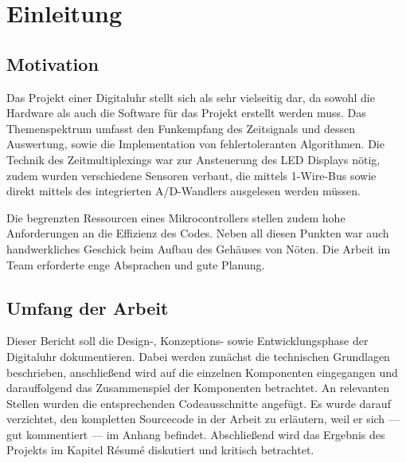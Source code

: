 \section{Einleitung}
\subsection{Motivation}
Das Projekt einer Digitaluhr stellt sich als sehr vielseitig dar, da sowohl die
Hardware als auch die Software für das Projekt erstellt werden muss. Das
Themenspektrum umfasst den Funkempfang des Zeitsignals und dessen Auswertung,
sowie die Implementation von fehlertoleranten Algorithmen. Die Technik des
Zeitmultiplexings war zur Ansteuerung des LED Displays nötig, zudem
wurden verschiedene Sensoren verbaut, die mittels 1-Wire-Bus sowie direkt mittels
des integrierten A/D-Wandlers ausgelesen werden müssen.

Die begrenzten Ressourcen eines Mikrocontrollers stellen zudem hohe
Anforderungen an die Effizienz des Codes. Neben all diesen Punkten war auch
handwerkliches Geschick beim Aufbau des Gehäuses von Nöten. Die Arbeit im Team
erforderte enge Absprachen und gute Planung.

\subsection{Umfang der Arbeit}
Dieser Bericht soll die Design-, Konzeptions- sowie Entwicklungsphase der Digitaluhr dokumentieren. Dabei werden zunächst die technischen Grundlagen beschrieben, anschließend wird auf die einzelnen Komponenten eingegangen und darauffolgend das Zusammenspiel der Komponenten betrachtet. 
An relevanten Stellen wurden die entsprechenden Codeausschnitte angefügt. Es wurde darauf verzichtet, den kompletten Sourcecode in der Arbeit zu erläutern, weil er sich --- gut kommentiert --- im Anhang befindet. Abschließend wird das Ergebnis des Projekts im Kapitel Résumé diskutiert und kritisch betrachtet.